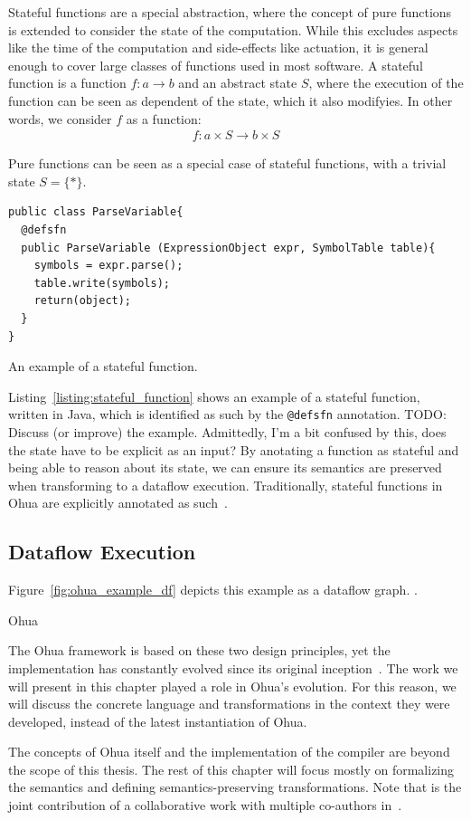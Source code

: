 Stateful functions are a special abstraction, where the concept of pure functions is extended to consider the state of the computation. 
While this excludes aspects like the time of the computation and side-effects like actuation, it is general enough to cover large classes of functions used in most software.
A stateful function is a function $f : a \rightarrow b$ and an abstract state $S$, where the execution of the function can be seen as dependent of the state, which it also modifyies.
In other words, we consider $f$ as a function:
\begin{align}
  f : a \times S \rightarrow b \times S \label{eqn:state_thread}
\end{align}

Pure functions can be seen as a special case of stateful functions, with a trivial state $S = \{*\}$.

\begin{listing}
\begin{verbatim}
public class ParseVariable{
  @defsfn
  public ParseVariable (ExpressionObject expr, SymbolTable table){
    symbols = expr.parse();
    table.write(symbols);
    return(object);
  }
}
\end{verbatim}
\caption{An example of a stateful function.}
\label{listing:stateful_function}
\end{listing}


Listing~\ref{listing:stateful_function} shows an example of a stateful function, written in Java, which is identified as such by the \texttt{@defsfn} annotation.
TODO: Discuss (or improve) the example. Admittedly, I'm a bit confused by this, does the state have to be explicit as an input?
By anotating a function as stateful and being able to reason about its state, we can ensure its semantics are preserved when transforming to a dataflow execution.
Traditionally, stateful functions in Ohua are explicitly annotated as such~\cite{ertel_pmam18}.

\subsection{Dataflow Execution}
\label{sec:ohua_dataflow}


Figure~\ref{fig:ohua_example_df} depicts this example as a dataflow graph.
.


Ohua

The Ohua framework is based on these two design principles, yet the implementation has constantly evolved since its original inception~\cite{ertel2014framework}.
The work we will present in this chapter played a role in Ohua's evolution.
For this reason, we will discuss the concrete language and transformations in the context they were developed, instead of the latest instantiation of Ohua.

The concepts of Ohua itself and the implementation of the compiler are beyond the scope of this thesis. 
The rest of this chapter will focus mostly on formalizing the semantics and defining semantics-preserving transformations. 
Note that is the joint contribution of a collaborative work with multiple co-authors in~\cite{goens_multiprog18,ertel_cc18,ertel_haskell19,ertel_haskellsup19}.